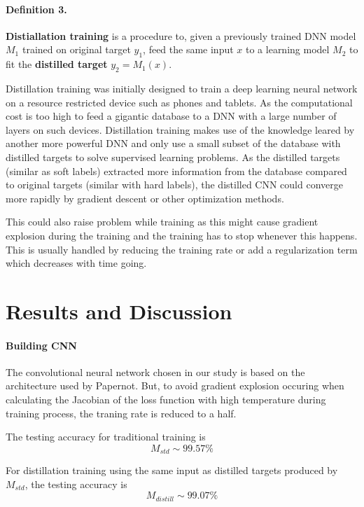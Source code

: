 \documentclass{article}
\begin{document}
\paragraph{Definition 3.} 
\textbf{Distiallation training} is a procedure to, given a previously trained DNN model $M_1$ trained on original target $y_1$, feed the same input $x$ to a learning model $M_2$ to fit the \textbf{distilled target} $y_2=M_1(x)$.\cite{Ba}

Distillation training was initially designed to train a deep learning neural network on a resource restricted device such as phones and tablets. As the computational cost is too high to feed a gigantic database to a DNN with a large number of layers on such devices. 
Distillation training makes use of the knowledge leared by another more powerful DNN and only use a small subset of the database with distilled targets to solve supervised learning problems.
As the distilled targets (similar as soft labels) extracted more information from the database compared to original targets (similar with hard labels), the distilled CNN could converge more rapidly by gradient descent or other optimization methods.

This could also raise problem while training as this might cause gradient explosion during the training and the training has to stop whenever this happens. This is usually handled by reducing the training rate or add a regularization term which decreases with time going.

\section{Results and Discussion}

\paragraph{Building CNN}The convolutional neural network chosen in our study is based on the architecture used by Papernot\cite{Papernot}.
 But, to avoid gradient explosion occuring when calculating the Jacobian of the loss function with high temperature during training process, the traning rate is reduced to a half.

The testing accuracy for traditional training is \\
\begin{equation}
M_{std} \sim  99.57\%
\end{equation}

For distillation training using the same input as distilled targets produced by $M_{std}$, the testing accuracy is \\
\begin{equation}
M_{distill} \sim 99.07\%
\end{equation}
\end{document}
